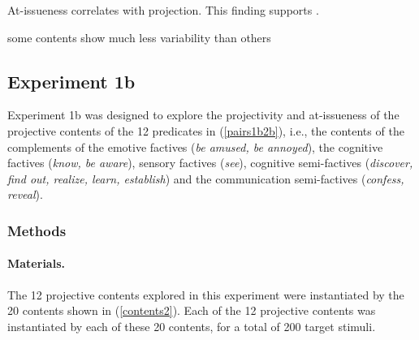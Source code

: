 \documentclass[11pt,fleqn]{article}
\newcommand{\6}{\mbox{$[\hspace*{-.6mm}[$}}
\newcommand{\9}{\mbox{$]\hspace*{-.6mm}]$}}
\begin{document}
At-issueness correlates with projection. This finding supports \citet{brst-salt10}. 

some contents show much less variability than others

\subsection{Experiment 1b}\label{s-exp1b} 

Experiment 1b was designed to explore the projectivity and at-issueness of the projective contents of the 12 predicates in (\ref{pairs1b2b}), i.e., the contents of the complements of the emotive factives ({\em be amused, be annoyed}), the cognitive factives ({\em know, be aware}), sensory factives ({\em see}), cognitive semi-factives ({\em discover, find out, realize, learn, establish}) and the communication semi-factives ({\em confess, reveal}).

\subsubsection{Methods}

\paragraph{Materials.} The 12 projective contents explored in this experiment were instantiated by the 20 contents shown in (\ref{contents2}). Each of the 12 projective contents was instantiated by each of these 20 contents, for a total of 200 target stimuli. 
\end{document}
